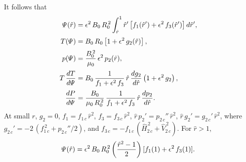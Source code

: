 \documentclass[12pt,prb,aps,notitlepage]{revtex4-1}
\begin{document}
It follows that
\begin{align}
{\mit\Psi}(\hat{r}) &= \epsilon^2\,B_0\,R_0^{\,2}\int_{\hat{r}}^1\hat{r}'\left[f_1(\hat{r}') +\epsilon^2\,f_3(\hat{r}')\right]d\hat{r}',\\[0.5ex]
T({\mit\Psi}) &= B_0\,R_0\left[1+\epsilon^2\,g_2(\hat{r})\right],\\[0.5ex]
p({\mit\Psi})&= \frac{B_0^{\,2}}{\mu_0}\,\epsilon^2\,p_2(\hat{r}),\\[0.5ex]
T\,\frac{dT}{d{\mit\Psi}}&= B_0\,\frac{1}{f_1+\epsilon^2\,f_3}\,\hat{r}\,\frac{dg_2}{d\hat{r}}\left(1+\epsilon^2\,g_2\right),\\[0.5ex]
\frac{dP}{d{\mit\Psi}} &=\frac{B_0}{\mu_0\,R_0^{\,2}}\,\frac{1}{f_1+\epsilon^2\,f_3}\,\hat{r}\,\frac{dp_2}{d\hat{r}}.
\end{align}
At small $\hat{r}$, $g_2=0$, $f_1=f_{1\,c}\,\hat{r}^2$,  $f_3=f_{3\,c}\,\hat{r}^2$, $\hat{r}\,p_2'=p_{2\,c}''\,\hat{r}^2$, $\hat{r}\,g_2' = g_{2\,c}'\,\hat{r}^2$, 
where $g_{2\,c}'= -2\,(f_{1\,c}^{\,2}+p_{2\,c}''/2)$, and $f_{3\,c}=-f_{1\,c}\,(\hat{H}_{2\,c}^{\,2}+\hat{V}_{2\,c}^{\,2})$. 
For $\hat{r}>1$, 
\begin{equation}
{\mit\Psi}(\hat{r}) = \epsilon^2\,B_0\,R_0^{\,2}\left(\frac{\hat{r}^2-1}{2}\right)[f_1(1)+\epsilon^2\,f_3(1)].
\end{equation}
\end{document}
